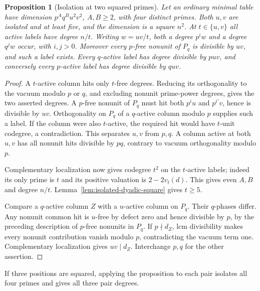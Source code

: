 \documentclass[11pt,a4paper]{article}
\numberwithin{equation}{section}
\newtheorem{proposition}[theorem]{Proposition}
\theoremstyle{remark}
\begin{document}
\begin{proposition}[Isolation at two squared primes]\label{fam:M:8.3}\label{prop:isolation}\label{prop:four-isolation}
Let an ordinary minimal table have dimension $p^Aq^B u^2v^2$,
$A,B\ge2$, with four distinct primes. Both $u,v$ are isolated and at least five, and the dimension is a square $n^2$. At $t\in\{u,v\}$
all active labels have degree $n/t$. Writing $w=uv/t$, both a degree
$p^i w$ and a degree $q^j w$ occur, with $i,j>0$. Moreover every
$p$-free nonunit of $P_q$ is divisible by $uv$, and such a label exists.
Every $q$-active label has degree divisible by $puv$, and conversely
every $p$-active label has degree divisible by $quv$.
\end{proposition}
\begin{proof}
A $t$-active column hits only $t$-free degrees. Reducing its
orthogonality to the vacuum modulo $p$ or $q$, and excluding nonunit
prime-power degrees, gives the two asserted degrees. A $p$-free nonunit
of $P_q$ must hit both $p^i u$ and $p^{i'}v$, hence is divisible by
$uv$. Orthogonality on $P_q$ of a $q$-active column modulo $p$ supplies
such a label. If the column were also $t$-active, the required hit
would have $t$-unit codegree, a contradiction. This separates $u,v$
from $p,q$. A column active at both $u,v$ has all nonunit hits divisible
by $pq$, contrary to vacuum orthogonality modulo $p$.

Complementary localization now gives codegree $t^2$ on the $t$-active
labels; indeed its only prime is $t$ and its positive valuation is
$2-2v_t(d)$. This gives even $A,B$ and degree $n/t$. Lemma~\ref{lem:isolated-dyadic-square}
gives $t\ge5$.

Compare a $q$-active column $Z$ with a $u$-active column on $P_q$.
Their $q$-phases differ. Any nonunit common hit is $u$-free by defect
zero and hence divisible by $p$, by the preceding description of
$p$-free nonunits in $P_q$. If $p\nmid d_Z$, lcm divisibility makes
every nonunit contribution vanish modulo $p$, contradicting the vacuum
term one. Complementary localization gives $uv\mid d_Z$. Interchange
$p,q$ for the other assertion.
\end{proof}
If three positions are squared, applying the proposition to each pair
isolates all four primes and gives all three pair degrees.
\end{document}
